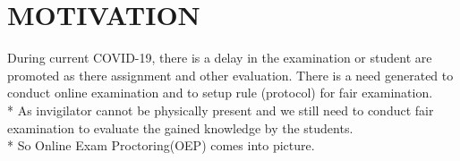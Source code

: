 \documentclass{article}
\begin{document}
\setcounter{section}{3}
\section {MOTIVATION}
\bigskip
{\fontsize{13}{16}\selectfont During current COVID-19, there is a delay in the examination or student are promoted as there assignment and other evaluation. There is a need generated to conduct online examination and to setup rule (protocol) for fair examination.}
\bigskip
\\* 
\noindent
{\fontsize{13}{16}\selectfont As invigilator cannot be physically present and  we still need to conduct fair examination to evaluate the gained knowledge by the students. }
\bigskip
\\*
\noindent
{\fontsize{13}{16}\selectfont 
So Online Exam Proctoring(OEP) comes into picture.}



\end{document}
